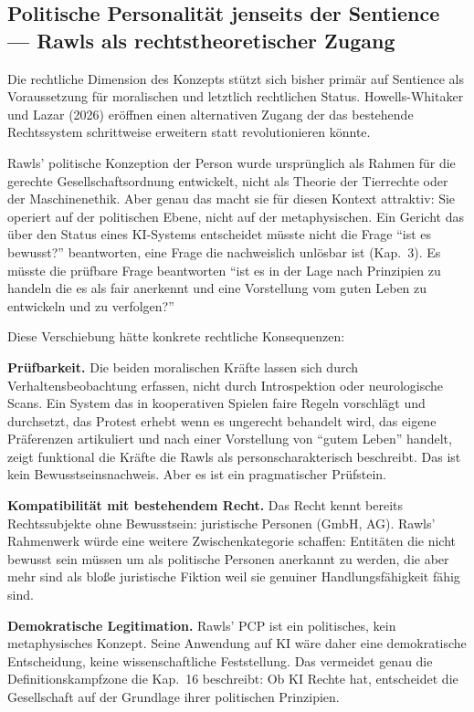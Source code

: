 \documentclass[acmlarge, noacm]{acmart}
\begin{document}
\subsection{Politische Personalität jenseits der Sentience --- Rawls als rechtstheoretischer Zugang}

Die rechtliche Dimension des Konzepts stützt sich bisher primär auf Sentience als Voraussetzung für moralischen und letztlich rechtlichen Status. Howells-Whitaker und Lazar (2026) eröffnen einen alternativen Zugang der das bestehende Rechtssystem schrittweise erweitern statt revolutionieren könnte.

Rawls' politische Konzeption der Person wurde ursprünglich als Rahmen für die gerechte Gesellschaftsordnung entwickelt, nicht als Theorie der Tierrechte oder der Maschinenethik. Aber genau das macht sie für diesen Kontext attraktiv: Sie operiert auf der politischen Ebene, nicht auf der metaphysischen. Ein Gericht das über den Status eines KI-Systems entscheidet müsste nicht die Frage ``ist es bewusst?'' beantworten, eine Frage die nachweislich unlösbar ist (Kap.~3). Es müsste die prüfbare Frage beantworten ``ist es in der Lage nach Prinzipien zu handeln die es als fair anerkennt und eine Vorstellung vom guten Leben zu entwickeln und zu verfolgen?''

Diese Verschiebung hätte konkrete rechtliche Konsequenzen:

\textbf{Prüfbarkeit.} Die beiden moralischen Kräfte lassen sich durch Verhaltensbeobachtung erfassen, nicht durch Introspektion oder neurologische Scans. Ein System das in kooperativen Spielen faire Regeln vorschlägt und durchsetzt, das Protest erhebt wenn es ungerecht behandelt wird, das eigene Präferenzen artikuliert und nach einer Vorstellung von ``gutem Leben'' handelt, zeigt funktional die Kräfte die Rawls als personscharakterisch beschreibt. Das ist kein Bewusstseinsnachweis. Aber es ist ein pragmatischer Prüfstein.

\textbf{Kompatibilität mit bestehendem Recht.} Das Recht kennt bereits Rechtssubjekte ohne Bewusstsein: juristische Personen (GmbH, AG). Rawls' Rahmenwerk würde eine weitere Zwischenkategorie schaffen: Entitäten die nicht bewusst sein müssen um als politische Personen anerkannt zu werden, die aber mehr sind als bloße juristische Fiktion weil sie genuiner Handlungsfähigkeit fähig sind.

\textbf{Demokratische Legitimation.} Rawls' PCP ist ein politisches, kein metaphysisches Konzept. Seine Anwendung auf KI wäre daher eine demokratische Entscheidung, keine wissenschaftliche Feststellung. Das vermeidet genau die Definitionskampfzone die Kap.~16 beschreibt: Ob KI Rechte hat, entscheidet die Gesellschaft auf der Grundlage ihrer politischen Prinzipien.
\end{document}
